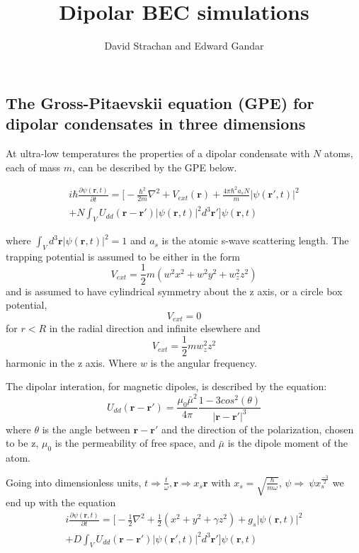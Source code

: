 \documentclass[10pt]{article}
\begin{document}
\author{ David Strachan and Edward Gandar }
\title{\textbf{Dipolar BEC simulations}}

\maketitle

\tableofcontents

\pagebreak

\begin{multicols}{2}

\section{The Gross-Pitaevskii equation (GPE) for dipolar condensates in three dimensions}

At ultra-low temperatures the properties of a dipolar condensate with $N$ atoms, each of mass $m$, can be described by the GPE below.

\begin{multline}
i\hbar \frac{\partial \psi(\textbf{r},t)}{\partial t}=\bigg[-\frac{\hbar^2}{2m}\nabla^2 + V_{ext}(\textbf{r}) + \frac{4\pi \hbar^2 a_{s} N}{m}|\psi(\textbf{r}',t)|^2 \\+ N \int_V U_{dd}(\textbf{r}-\textbf{r}')|\psi(\textbf{r},t)|^2d^3\textbf{r}' \bigg]\psi(\textbf{r},t)
\end{multline}

where $\int_V d^3\textbf{r} |\psi(\textbf{r},t)|^2 = 1$ and $a_{s}$ is the atomic s-wave scattering length. The trapping potential is assumed to be either in the form $$V_{ext}=\frac{1}{2}m(w^2 x^2+w^2 y^2+w_{z}^2z^2)$$ and is assumed to have cylindrical symmetry about the z axis, or a circle box potential,
$$V_{ext}=0$$ for $r<R$ in the radial direction and infinite elsewhere and $$V_{ext}=\frac{1}{2}mw_{z}^2z^2$$ harmonic in the z axis. Where $w$ is the angular frequency.

The dipolar interation, for magnetic dipoles, is described by the equation:
\begin{equation}
U_{dd}(\textbf{r}-\textbf{r}') = \frac{\mu_{0} \bar{\mu}^2}{4\pi} \frac{1-3 cos^2(\theta)}{|\textbf{r}-\textbf{r}'|^3}
\end{equation}
where $\theta$ is the angle between $\textbf{r}-\textbf{r}'$ and the direction of the polarization, chosen to be z, $\mu_{0}$ is the permeability of free space, and $\bar{\mu}$ is the dipole moment of the atom.

Going into dimensionless units, $t \Rightarrow \frac{t}{\omega}, \textbf{r} \Rightarrow x_{s}\textbf{r}$ with $x_{s}=\sqrt{\frac{\hbar}{m\omega}}$, $\psi \Rightarrow \ \psi x_{s}^\frac{-3}{2}$ we end up with the equation
\begin{multline}
i\frac{\partial \psi(\textbf{r},t)}{\partial t}=\bigg[-\frac{1}{2}\nabla^2 + \frac{1}{2}(x^2+y^2+\gamma z^2) + g_{s}|\psi(\textbf{r},t)|^2 \\+ D \int_V U_{dd}(\textbf{r}-\textbf{r}')|\psi(\textbf{r}',t)|^2d^3\textbf{r}' \bigg]\psi(\textbf{r},t)
\end{multline}


\end{multicols}
\end{document}

